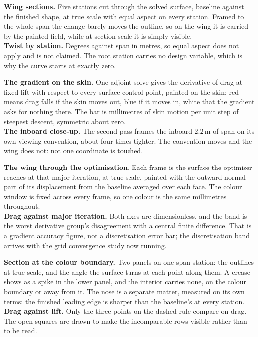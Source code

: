 \documentclass[9pt,a4paper]{article}
\renewcommand{\footnotesize}{\fontsize{6.4}{6.85}\selectfont}
\begin{document}
\vspace{1.5pt}
{\footnotesize
\begin{minipage}[t]{0.487\textwidth}
\textbf{Wing sections.} Five stations cut through the solved surface, baseline
against the finished shape, at true scale with equal aspect on every station.
Framed to the whole span the change barely moves the outline, so on the wing it
is carried by the painted field, while at section scale it is simply visible.\\[2pt]
\textbf{Twist by station.} Degrees against span in metres, so equal aspect does
not apply and is not claimed. The root station carries no design variable, which
is why the curve starts at exactly zero.
\end{minipage}\hfill
\begin{minipage}[t]{0.487\textwidth}
\textbf{The gradient on the skin.} One adjoint solve gives the derivative of
drag at fixed lift with respect to every surface control point, painted on the
skin: red means drag falls if the skin moves out, blue if it moves in, white
that the gradient asks for nothing there. The bar is millimetres of skin motion
per unit step of steepest descent, symmetric about zero.\\[2pt]
\textbf{The inboard close-up.} The second pass frames the inboard $2.2$\,m of
span on its own viewing convention, about four times tighter. The convention
moves and the wing does not: not one coordinate is touched.
\end{minipage}

\vspace{3pt}
\begin{minipage}[t]{0.487\textwidth}
\textbf{The wing through the optimisation.} Each frame is the surface the
optimiser reaches at that major iteration, at true scale, painted with the
outward normal part of its displacement from the baseline averaged over each
face. The colour window is fixed across every frame, so one colour is the same
millimetres throughout.\\[2pt]
\textbf{Drag against major iteration.} Both axes are dimensionless, and the band
is the worst derivative group's disagreement with a central finite difference.
That is a gradient accuracy figure, not a discretisation error bar; the
discretisation band arrives with the grid convergence study now running.
\end{minipage}\hfill
\begin{minipage}[t]{0.487\textwidth}
\textbf{Section at the colour boundary.} Two panels on one span station: the
outlines at true scale, and the angle the surface turns at each point along
them. A crease shows as a spike in the lower panel, and the interior carries
none, on the colour boundary or away from it. The nose is a separate matter,
measured on its own terms: the finished leading edge is sharper than the
baseline's at every station.\\[2pt]
\textbf{Drag against lift.} Only the three points on the dashed rule compare on
drag. The open squares are drawn to make the incomparable rows visible rather
than to be read.
\end{minipage}}
\end{document}
